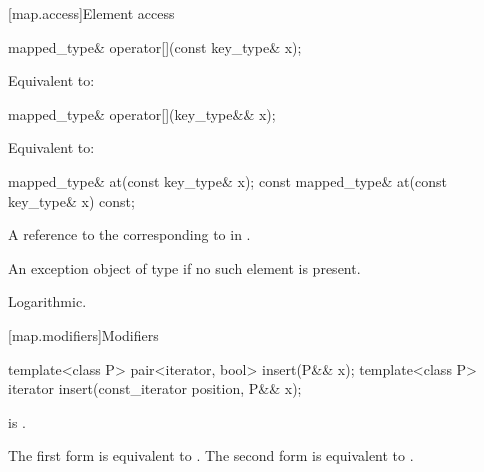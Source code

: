 [map.access]{Element access}

%
\begin{itemdecl}
mapped_type& operator[](const key_type& x);
\end{itemdecl}

\begin{itemdescr}
\pnum
\effects
Equivalent to: 
\end{itemdescr}

%
\begin{itemdecl}
mapped_type& operator[](key_type&& x);
\end{itemdecl}

\begin{itemdescr}
\pnum
\effects
Equivalent to: 
\end{itemdescr}

%
\begin{itemdecl}
mapped_type&       at(const key_type& x);
const mapped_type& at(const key_type& x) const;
\end{itemdecl}

\begin{itemdescr}
\pnum
\returns
A reference to the  corresponding to  in .

\pnum
\throws
An exception object of type  if
no such element is present.

\pnum
\complexity
Logarithmic.
\end{itemdescr}

[map.modifiers]{Modifiers}

%
\begin{itemdecl}
template<class P>
  pair<iterator, bool> insert(P&& x);
template<class P>
  iterator insert(const_iterator position, P&& x);
\end{itemdecl}

\begin{itemdescr}
\pnum
\constraints
{} is .

\pnum
\effects
The first form is equivalent to
. The second form is
equivalent to .
\end{itemdescr}

